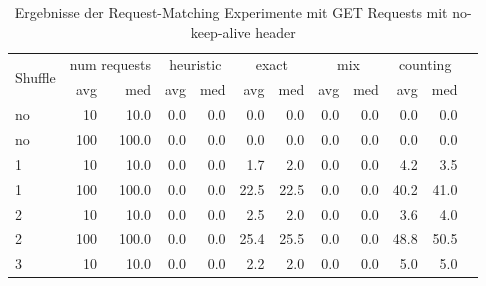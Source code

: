 \documentclass[12pt,a4paper]{report}
\begin{document}
\begin{table}[H]
	\centering
	\caption{Ergebnisse der Request-Matching Experimente mit GET Requests mit no-keep-alive header}
	\label{tab:get_nka}
	\begin{tabular}{|l|r|r|r|r|r|r|r|r|r|r|r|}
		\hline
		\multirow{2}{*}{Shuffle} & \multicolumn{2}{|c|}{num requests} & \multicolumn{2}{|c|}{heuristic} & \multicolumn{2}{|c|}{exact} & \multicolumn{2}{|c|}{mix} & \multicolumn{2}{|c|}{counting}                                  \\ \cline{2-11}
		                         & avg                                & med                             & avg                         & med                       & avg                            & med  & avg & med & avg  & med  \\ \hline
		no                       & 10                                 & 10.0                            & 0.0                         & 0.0                       & 0.0                            & 0.0  & 0.0 & 0.0 & 0.0  & 0.0  \\ \hline
		no                       & 100                                & 100.0                           & 0.0                         & 0.0                       & 0.0                            & 0.0  & 0.0 & 0.0 & 0.0  & 0.0  \\ \hline
		1                        & 10                                 & 10.0                            & 0.0                         & 0.0                       & 1.7                            & 2.0  & 0.0 & 0.0 & 4.2  & 3.5  \\ \hline
		1                        & 100                                & 100.0                           & 0.0                         & 0.0                       & 22.5                           & 22.5 & 0.0 & 0.0 & 40.2 & 41.0 \\ \hline
		2                        & 10                                 & 10.0                            & 0.0                         & 0.0                       & 2.5                            & 2.0  & 0.0 & 0.0 & 3.6  & 4.0  \\ \hline
		2                        & 100                                & 100.0                           & 0.0                         & 0.0                       & 25.4                           & 25.5 & 0.0 & 0.0 & 48.8 & 50.5 \\ \hline
		3                        & 10                                 & 10.0                            & 0.0                         & 0.0                       & 2.2                            & 2.0  & 0.0 & 0.0 & 5.0  & 5.0  \\ \hline

\end{tabular}
\end{table}
\end{document}
